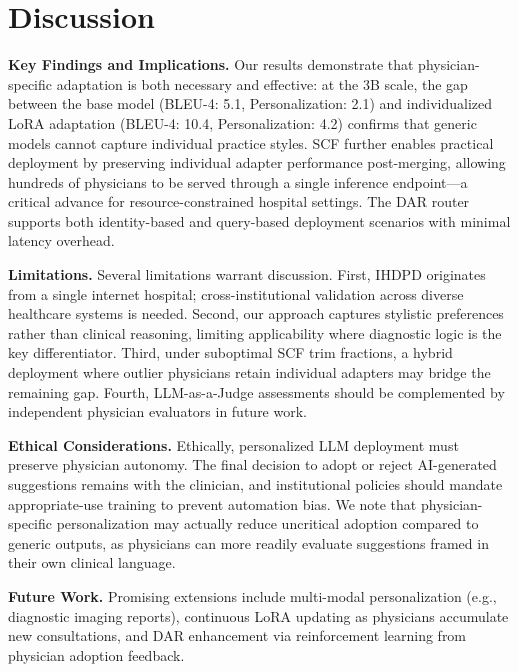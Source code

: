 \section{Discussion}

\textbf{Key Findings and Implications.} Our results demonstrate that physician-specific adaptation is both necessary and effective: at the 3B scale, the gap between the base model (BLEU-4: 5.1, Personalization: 2.1) and individualized LoRA adaptation (BLEU-4: 10.4, Personalization: 4.2) confirms that generic models cannot capture individual practice styles. SCF further enables practical deployment by preserving individual adapter performance post-merging, allowing hundreds of physicians to be served through a single inference endpoint---a critical advance for resource-constrained hospital settings. The DAR router supports both identity-based and query-based deployment scenarios with minimal latency overhead.


\textbf{Limitations.} Several limitations warrant discussion. First, IHDPD originates from a single internet hospital; cross-institutional validation across diverse healthcare systems is needed. Second, our approach captures stylistic preferences rather than clinical reasoning, limiting applicability where diagnostic logic is the key differentiator. Third, under suboptimal SCF trim fractions, a hybrid deployment where outlier physicians retain individual adapters may bridge the remaining gap. Fourth, LLM-as-a-Judge assessments should be complemented by independent physician evaluators in future work.


\textbf{Ethical Considerations.} Ethically, personalized LLM deployment must preserve physician autonomy. The final decision to adopt or reject AI-generated suggestions remains with the clinician, and institutional policies should mandate appropriate-use training to prevent automation bias. We note that physician-specific personalization may actually reduce uncritical adoption compared to generic outputs, as physicians can more readily evaluate suggestions framed in their own clinical language. 

\textbf{Future Work.} Promising extensions include multi-modal personalization (e.g., diagnostic imaging reports), continuous LoRA updating as physicians accumulate new consultations, and DAR enhancement via reinforcement learning from physician adoption feedback.
